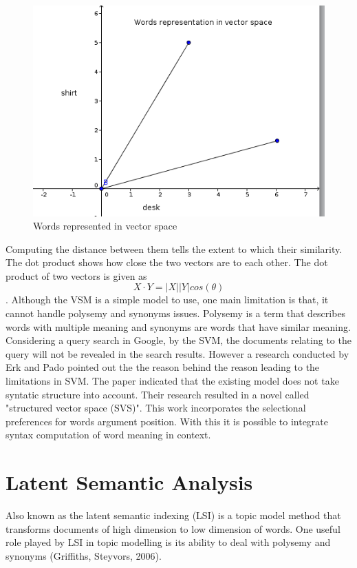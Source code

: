 \begin{figure}[hbtp]
\centering
\includegraphics[scale=1]{words_in_vs.png}
\caption{Words represented in vector space}
\end{figure}
\label{figure 2.1}
Computing the distance between them tells the extent to which their similarity. The dot product shows how close the two vectors are to each other. The dot product of two vectors is given as
$$X\cdot Y=|X||Y|cos (\theta)$$.
Although the VSM is a simple model to use, one main limitation is that, it cannot handle polysemy and synonyms issues. Polysemy is a term that describes words with multiple meaning and synonyms are words that have similar meaning. Considering a query search in Google, by the SVM, the documents relating to the query will not be revealed in the search results. However a research conducted by Erk and Pado pointed out the the reason behind the reason leading to the limitations in SVM. The paper indicated that the existing model does not take syntatic structure into account. Their research resulted in a novel called "structured vector space (SVS)". This work incorporates the selectional preferences for words argument position. With this it is possible to integrate syntax computation of word meaning in context.
\section{Latent Semantic Analysis} 
Also known as the latent semantic indexing (LSI) is a topic model method
that transforms documents of high dimension to low dimension of words. One useful role played by LSI in topic modelling is its ability to deal with polysemy and synonyms (Griffiths, Steyvors, 2006).
